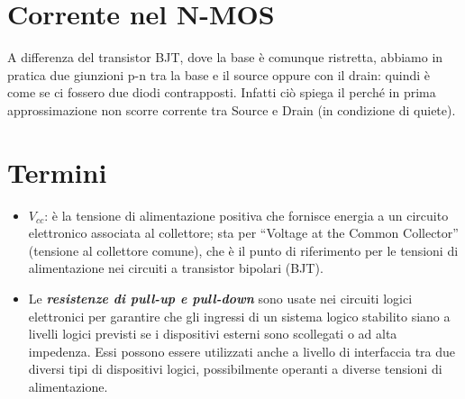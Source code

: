 \documentclass[
]{book}
\providecommand{\tightlist}{%
  \setlength{\itemsep}{0pt}\setlength{\parskip}{0pt}}
\begin{document}
\section{Corrente nel N-MOS}\label{corrente-nel-n-mos}

A differenza del transistor BJT, dove la base è comunque ristretta,
abbiamo in pratica due giunzioni p-n tra la base e il source oppure con
il drain: quindi è come se ci fossero due diodi contrapposti. Infatti
ciò spiega il perché in prima approssimazione non scorre corrente tra
Source e Drain (in condizione di quiete).

\section{Termini}\label{termini}

\begin{itemize}
\tightlist
\item
  \(V_{cc}\): è la tensione di alimentazione positiva che fornisce
  energia a un circuito elettronico associata al collettore; sta per
  ``Voltage at the Common Collector'' (tensione al collettore comune),
  che è il punto di riferimento per le tensioni di alimentazione nei
  circuiti a transistor bipolari (BJT).
\item
  Le \textbf{\emph{resistenze di pull-up e pull-down}} sono usate nei
  circuiti logici elettronici per garantire che gli ingressi di un
  sistema logico stabilito siano a livelli logici previsti se i
  dispositivi esterni sono scollegati o ad alta impedenza. Essi possono
  essere utilizzati anche a livello di interfaccia tra due diversi tipi
  di dispositivi logici, possibilmente operanti a diverse tensioni di
  alimentazione.

  \begin{table}[H]
    \centering
    \caption{Tabella di comportamento del segnale dell'interruttore con vari resistori}
  \end{table}
\end{itemize}

\backmatter
\end{document}
